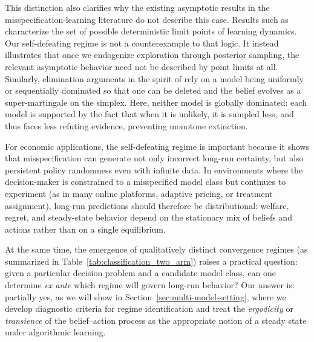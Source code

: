 \documentclass[12pt]{article}
\begin{document}
This distinction also clarifies why the existing asymptotic results in the misspecification-learning literature do not describe this case. Results such as \citet{fudenbergLimitPointsEndogenous2021a} characterize the set of possible deterministic limit points of learning dynamics. Our self-defeating regime is not a counterexample to that logic. It instead illustrates that once we endogenize exploration through posterior sampling, the relevant asymptotic behavior need not be described by point limits at all. Similarly, elimination arguments in the spirit of \citet{frickBeliefConvergenceMisspecified2023} rely on a model being uniformly or sequentially dominated so that one can be deleted and the belief evolves as a super-martingale on the simplex. Here, neither model is globally dominated: each model is supported by the fact that when it is unlikely, it is sampled less, and thus faces less refuting evidence, preventing monotone extinction.

For economic applications, the self-defeating regime is important because it shows that misspecification can generate not only incorrect long-run certainty, but also persistent policy randomness even with infinite data. In environments where the decision-maker is constrained to a misspecified model class but continues to experiment (as in many online platforms, adaptive pricing, or treatment assignment), long-run predictions should therefore be distributional: welfare, regret, and steady-state behavior depend on the stationary mix of beliefs and actions rather than on a single equilibrium. 

At the same time, the emergence of qualitatively distinct convergence regimes (as summarized in Table~\ref{tab:classification_two_arm}) raises a practical question: given a particular decision problem and a candidate model class, can one determine \emph{ex ante} which regime will govern long-run behavior? Our answer is: partially yes, as we will show in Section~\ref{sec:multi-model-setting}, where we develop diagnostic criteria for regime identification and treat the \emph{ergodicity} or \emph{transience} of the belief--action process as the appropriate notion of a steady state under algorithmic learning.
\end{document}
